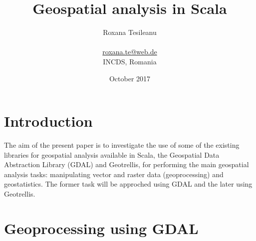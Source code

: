 \documentclass {article}
\title {Geospatial analysis in Scala}
\date {October 2017}
\author {Roxana Tesileanu \\
\\
\href{mailto: roxana.te@web.de}{roxana.te@web.de} \\
INCDS, Romania}
\begin{document}
	\maketitle

\tableofcontents

\section {Introduction}

The aim of the present paper is to investigate the use of some of the existing libraries for geospatial analysis available in Scala, the Geospatial Data Abstraction Library (GDAL) and Geotrellis, for performing the main geospatial analysis tasks: manipulating vector and raster data (geoprocessing) and geostatistics.
The former task will be approched using GDAL and the later using Geotrellis.  

\section {Geoprocessing using GDAL}
\end{document}
